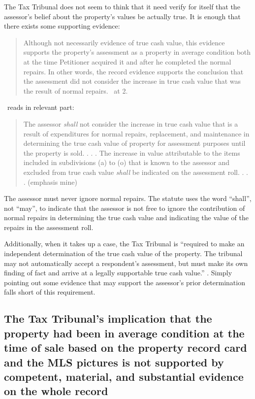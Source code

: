 \documentclass[12pt,\documentclassflag]{michiganCourtOfAppealsBrief}
\def\mathieuGast{\pincite[l]{MCL}{211.27(2)}}
\begin{document}
The Tax Tribunal does not seem to think that it need verify for itself that the assessor's belief about the property's values be actually true. It is enough that there exists some supporting evidence:

\begin{quote}
	Although not necessarily evidence of true cash value, this evidence supports the property's assessment as a property in average condition both at the time Petitioner acquired it and after he completed the normal repairs. In other words, the record evidence supports the conclusion that the assessment did not consider the increase in true cash value that was the result of normal repairs. \orderDenying\ at 2. 
\end{quote}

\mathieuGast\ reads in relevant part:

\begin{quote}
	The assessor \textit{shall} not consider the increase in true cash value that is a result of expenditures for normal repairs, replacement, and maintenance in determining the true cash value of property for assessment purposes until the property is sold. . . . The increase in value attributable to the items included in subdivisions (a) to (o) that is known to the assessor and excluded from true cash value \textit{shall} be indicated on the assessment roll. . . . (emphasis mine)
\end{quote}

The assessor must never ignore normal repairs. The statute uses the word ``shall'', not ``may'', to indicate that the assessor is not free to ignore the contribution of normal repairs in determining the true cash value and indicating the value of the repairs in the assessment roll. 

Additionally, when it takes up a case, the  Tax Tribunal is ``required to make an independent determination of the true cash value of the property. The tribunal may not automatically accept a respondent's assessment, but must make its own finding of fact and arrive at a legally supportable true cash value.'' . Simply pointing out some evidence that may support the assessor's prior determination falls short of this requirement.

\subsection{The Tax Tribunal's implication that the property had been in average condition at the time of sale based on the property record card and the MLS pictures is not supported by competent, material, and substantial evidence on the whole record}
\end{document}

